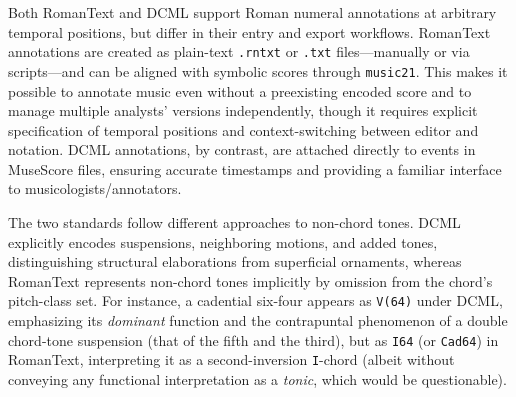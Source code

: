 \documentclass[sigconf]{acmart} %
\begin{document}
Both RomanText and DCML support Roman numeral annotations at arbitrary temporal positions, but differ in their entry and export workflows. RomanText annotations are created as plain-text \texttt{.rntxt} or \texttt{.txt} files---manually or via scripts---and can be aligned with symbolic scores through \texttt{music21}. This makes it possible to annotate music even without a preexisting encoded score and to manage multiple analysts’ versions independently, though it requires explicit specification of temporal positions and context-switching between editor and notation. DCML annotations, by contrast, are attached directly to events in MuseScore files, ensuring accurate timestamps and providing a familiar interface to musicologists/annotators.

The two standards follow different approaches to non-chord tones. DCML explicitly encodes suspensions, neighboring motions, and added tones, distinguishing structural elaborations from superficial ornaments, whereas RomanText represents non-chord tones implicitly by omission from the chord’s pitch-class set. For instance, a cadential six-four appears as \texttt{V(64)} under DCML, emphasizing its \textit{dominant} function and the contrapuntal phenomenon of a double chord-tone suspension (that of the fifth and the third), but as \texttt{I64} (or \texttt{Cad64}) in RomanText, interpreting it as a second-inversion \texttt{I}-chord (albeit without conveying any functional interpretation as a \textit{tonic}, which would be questionable).

\end{document}
